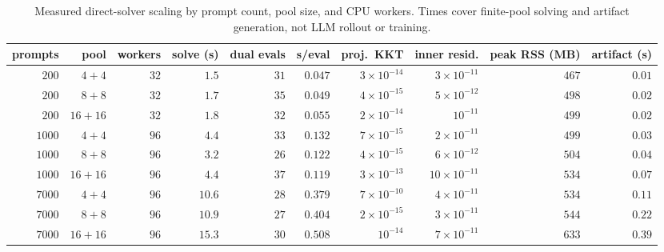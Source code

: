 \documentclass{article}
\theoremstyle{remark}
\theoremstyle{plain}
\begin{document}
\begin{table}[t]
\centering\scriptsize
\setlength{\tabcolsep}{2.8pt}
\caption{Measured direct-solver scaling by prompt count, pool size, and CPU workers. Times cover finite-pool solving and artifact generation, not LLM rollout or training.}
\label{tab:solver-scaling}
\begin{tabular}{rrrrrrrrrr}
\toprule
prompts & pool & workers & solve (s) & dual evals & s/eval & proj.\ KKT & inner resid. & peak RSS (MB) & artifact (s)\\
\midrule
$200$ & $4{+}4$ & $32$ & $1.5$ & $31$ & $0.047$ & $3\times10^{-14}$ & $3\times10^{-11}$ & $467$ & $0.01$\\
$200$ & $8{+}8$ & $32$ & $1.7$ & $35$ & $0.049$ & $4\times10^{-15}$ & $5\times10^{-12}$ & $498$ & $0.02$\\
$200$ & $16{+}16$ & $32$ & $1.8$ & $32$ & $0.055$ & $2\times10^{-14}$ & $10^{-11}$ & $499$ & $0.02$\\
$1000$ & $4{+}4$ & $96$ & $4.4$ & $33$ & $0.132$ & $7\times10^{-15}$ & $2\times10^{-11}$ & $499$ & $0.03$\\
$1000$ & $8{+}8$ & $96$ & $3.2$ & $26$ & $0.122$ & $4\times10^{-15}$ & $6\times10^{-12}$ & $504$ & $0.04$\\
$1000$ & $16{+}16$ & $96$ & $4.4$ & $37$ & $0.119$ & $3\times10^{-13}$ & $10\times10^{-11}$ & $534$ & $0.07$\\
$7000$ & $4{+}4$ & $96$ & $10.6$ & $28$ & $0.379$ & $7\times10^{-10}$ & $4\times10^{-11}$ & $534$ & $0.11$\\
$7000$ & $8{+}8$ & $96$ & $10.9$ & $27$ & $0.404$ & $2\times10^{-15}$ & $3\times10^{-11}$ & $544$ & $0.22$\\
$7000$ & $16{+}16$ & $96$ & $15.3$ & $30$ & $0.508$ & $10^{-14}$ & $7\times10^{-11}$ & $633$ & $0.39$\\
\bottomrule
\end{tabular}
\end{table}
\end{document}
